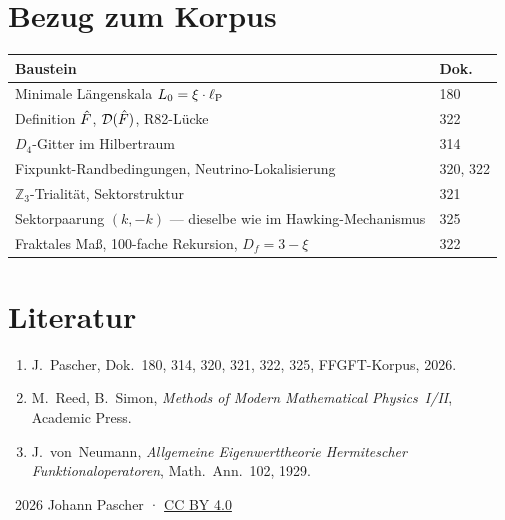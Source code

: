 \section*{Bezug zum Korpus}

\begin{center}
\begin{tabular}{@{}ll@{}}
  \toprule
  \textbf{Baustein} & \textbf{Dok.} \\
  \midrule
  Minimale Längenskala $L_0 = \xi\cdot\ell_{\mathrm{P}}$ & 180 \\
  Definition $\hat{F}$, $\mathcal{D}(\hat{F})$, R82-Lücke & 322 \\
  $D_4$-Gitter im Hilbertraum & 314 \\
  Fixpunkt-Randbedingungen, Neutrino-Lokalisierung & 320, 322 \\
  $\mathbb{Z}_3$-Trialität, Sektorstruktur & 321 \\
  Sektorpaarung $(k,-k)$ — dieselbe wie im Hawking-Mechanismus & 325 \\
  Fraktales Maß, 100-fache Rekursion, $D_f = 3-\xi$ & 322 \\
  \bottomrule
\end{tabular}
\end{center}

\section*{Literatur}

\begin{enumerate}
  \item J.~Pascher, Dok.~180, 314, 320, 321, 322, 325, FFGFT-Korpus, 2026.
  \item M.~Reed, B.~Simon, \textit{Methods of Modern Mathematical Physics~I/II},
    Academic Press.
  \item J.~von~Neumann, \textit{Allgemeine Eigenwerttheorie Hermitescher
    Funktionaloperatoren}, Math.\ Ann.\ 102, 1929.
\end{enumerate}

\vspace{6pt}\noindent\small
\textcopyright\ 2026 Johann Pascher ·
\href{https://creativecommons.org/licenses/by/4.0/}{CC BY 4.0}
